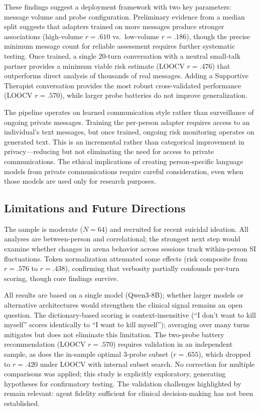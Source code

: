 \documentclass[review,12pt,authoryear]{elsarticle}
\begin{document}
These findings suggest a deployment framework with two key parameters: message volume and probe configuration. Preliminary evidence from a median split suggests that adapters trained on more messages produce stronger associations (high-volume $r = .610$ vs.\ low-volume $r = .186$), though the precise minimum message count for reliable assessment requires further systematic testing. Once trained, a single 20-turn conversation with a neutral small-talk partner provides a minimum viable risk estimate (LOOCV $r = .476$) that outperforms direct analysis of thousands of real messages. Adding a Supportive Therapist conversation provides the most robust cross-validated performance (LOOCV $r = .570$), while larger probe batteries do not improve generalization.

The pipeline operates on learned communication style rather than surveillance of ongoing private messages. Training the per-person adapter requires access to an individual's text messages, but once trained, ongoing risk monitoring operates on generated text. This is an incremental rather than categorical improvement in privacy---reducing but not eliminating the need for access to private communications. The ethical implications of creating person-specific language models from private communications require careful consideration, even when those models are used only for research purposes.

\subsection{Limitations and Future Directions}

The sample is moderate ($N = 64$) and recruited for recent suicidal ideation. All analyses are between-person and correlational; the strongest next step would examine whether changes in arena behavior across sessions track within-person SI fluctuations. Token normalization attenuated some effects (risk composite from $r = .576$ to $r = .438$), confirming that verbosity partially confounds per-turn scoring, though core findings survive.

All results are based on a single model (Qwen3-8B); whether larger models or alternative architectures would strengthen the clinical signal remains an open question. The dictionary-based scoring is context-insensitive (``I don't want to kill myself'' scores identically to ``I want to kill myself''); averaging over many turns mitigates but does not eliminate this limitation. The two-probe battery recommendation (LOOCV $r = .570$) requires validation in an independent sample, as does the in-sample optimal 3-probe subset ($r = .655$), which dropped to $r = .420$ under LOOCV with internal subset search. No correction for multiple comparisons was applied; this study is explicitly exploratory, generating hypotheses for confirmatory testing. The validation challenges highlighted by \citet{tornberg2025validation} remain relevant: agent fidelity sufficient for clinical decision-making has not been established.
\end{document}
